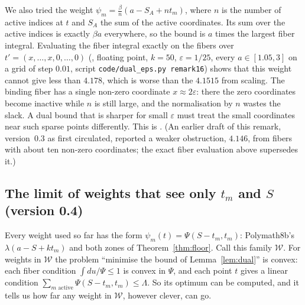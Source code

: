 \begin{remark}
We also tried the weight $\psi_m=\frac{\beta}{n}(a-S_A+nt_m)$, where $n$ is
the number of active indices at $t$ and $S_A$ the sum of the active
coordinates. Its sum over the active indices is exactly $\beta a$ everywhere,
so the bound is $a$ times the largest fiber integral. Evaluating the fiber
integral exactly on the fibers over $t'=(x,\dots,x,0,\dots,0)$ (,
floating point, $k=50$, $\varepsilon=1/25$, every $a\in[1.05,3]$ on a grid of
step $0.01$, script \texttt{code/dual\_eps.py remark16}) shows that this
weight cannot give less than $4.178$, which is worse than the $4.1515$ from
scaling. The binding fiber has a single non-zero coordinate $x\approx2\varepsilon$:
there the zero coordinates become inactive while $n$ is still large, and the
normalisation by $n$ wastes the slack. A dual bound that is sharper for small
$\varepsilon$ must treat the small coordinates near such sparse points
differently. This is . (An earlier draft of this remark, version~0.3
as first circulated, reported a weaker obstruction, $4.146$, from fibers with
about ten non-zero coordinates; the exact fiber evaluation above supersedes it.)
\end{remark}

\subsection*{The limit of weights that see only \texorpdfstring{$t_m$}{t\_m} and \texorpdfstring{$S$}{S} (version 0.4)}
Every weight used so far has the form
$\psi_m(t)=\Psi(S-t_m,t_m)$: Polymath8b's $\lambda(a-S+kt_m)$ and both zones of
Theorem~\ref{thm:floor}. Call this family $\mathcal W$. For weights in
$\mathcal W$ the problem ``minimise the bound of Lemma~\ref{lem:dual}'' is
convex: each fiber condition $\int du/\Psi\le1$ is convex in $\Psi$, and each
point $t$ gives a linear condition $\sum_{m\text{ active}}\Psi(S-t_m,t_m)\le\Lambda$.
So its optimum can be computed, and it tells us how far any weight in
$\mathcal W$, however clever, can go.

